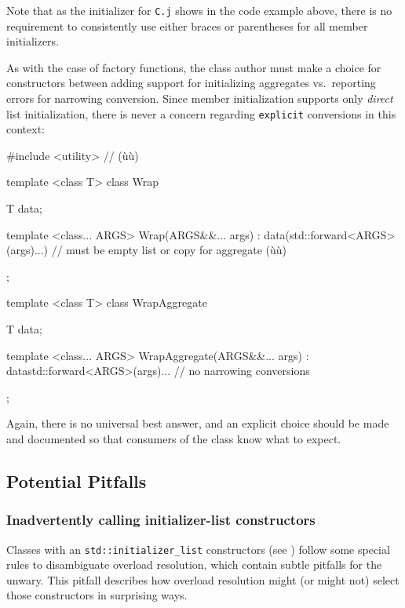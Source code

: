 \noindent Note that as the initializer for \lstinline!C.j! shows in the code example
above, there is no requirement to consistently use either braces or
parentheses for all member initializers.

As with the case of factory functions, the class author must make a
choice for constructors between adding support for initializing
aggregates vs.~reporting errors for narrowing conversion. Since member
initialization supports only \emph{direct} list initialization, there is
never a concern regarding \lstinline!explicit! conversions in this context:

\begin{emcppshiddenlisting}[emcppsbatch=e19]
#include <utility>  // (ù{}ù)
\end{emcppshiddenlisting}
\begin{emcppslisting}[emcppsbatch=e19]
template <class T>
class Wrap
{
    T data;

    template <class... ARGS>
    Wrap(ARGS&&... args)
    : data(std::forward<ARGS>(args)...)
        // must be empty list or copy for aggregate (ù{}ù)
    {
    }
};

template <class T>
class WrapAggregate
{
    T data;

    template <class... ARGS>
    WrapAggregate(ARGS&&... args)
    : data{std::forward<ARGS>(args)...}  // no narrowing conversions
    {
    }
};
\end{emcppslisting}
    

\noindent Again, there is no universal best answer, and an explicit choice should
be made and documented so that consumers of the class know what to
expect.

\subsection[Potential Pitfalls]{Potential Pitfalls}\label{potential-pitfalls-bracedinit}

\subsubsection[Inadvertently calling initializer-list constructors]{Inadvertently calling initializer-list constructors}\label{inadvertently-calling-initializer-list-constructors}

Classes with an \lstinline!std::initializer_list! constructors (see
) follow some special rules to disambiguate
overload resolution, which contain subtle pitfalls for the unwary. This
pitfall describes how overload resolution might (or might not) select
those constructors in surprising ways.

